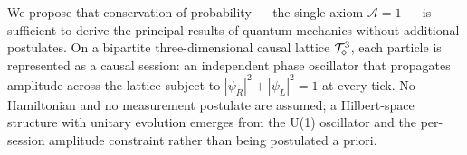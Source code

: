 
We propose that conservation of probability --- the single axiom $\mathcal{A}=1$
--- is sufficient to derive the principal results of quantum mechanics without
additional postulates.
On a bipartite three-dimensional causal lattice $\mathcal{T}_\diamond^3$,
each particle is represented as a causal session: an independent phase oscillator
that propagates amplitude across the lattice subject to $|\psi_R|^2 +
|\psi_L|^2 = 1$ at every tick.
No Hamiltonian and no measurement postulate are assumed; a
Hilbert-space structure with unitary evolution emerges from the
U(1) oscillator and the per-session amplitude constraint rather
than being postulated a priori.

